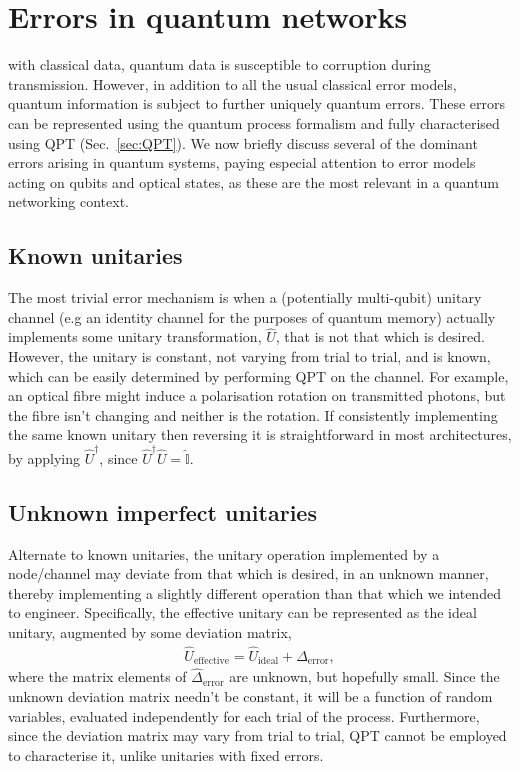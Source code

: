 %
%

\section{Errors in quantum networks} \label{sec:errors_in_nets} 

 with classical data, quantum data is susceptible to corruption during transmission. However, in addition to all the usual classical error models, quantum information is subject to further uniquely quantum errors. These errors can be represented using the quantum process formalism and fully characterised using QPT (Sec.~\ref{sec:QPT}). We now briefly discuss several of the dominant errors arising in quantum systems, paying especial attention to error models acting on qubits and optical states, as these are the most relevant in a quantum networking context.

%
%

\subsection{Known unitaries} 

The most trivial error mechanism is when a (potentially multi-qubit) unitary channel (e.g an identity channel for the purposes of quantum memory) actually implements some unitary transformation, $\hat{U}$, that is not that which is desired. However, the unitary is constant, not varying from trial to trial, and is known, which can be easily determined by performing QPT on the channel. For example, an optical fibre might induce a polarisation rotation on transmitted photons, but the fibre isn't changing and neither is the rotation. If consistently implementing the same known unitary then reversing it is straightforward in most architectures, by applying $\hat{U}^\dag$, since $\hat{U}^\dag\hat{U}=\hat{\mathbb{I}}$.

%
%

\subsection{Unknown imperfect unitaries} 

Alternate to known unitaries, the unitary operation implemented by a node/channel may deviate from that which is desired, in an unknown manner, thereby implementing a slightly different operation than that which we intended to engineer. Specifically, the effective unitary can be represented as the ideal unitary, augmented by some deviation matrix,
\begin{align}
	\hat{U}_\mathrm{effective} = \hat{U}_\mathrm{ideal} + \hat{\Delta}_\mathrm{error},
\end{align}
where the matrix elements of $\hat{\Delta}_\mathrm{error}$ are unknown, but hopefully small. Since the unknown deviation matrix needn't be constant, it will be a function of random variables, evaluated independently for each trial of the process. Furthermore, since the deviation matrix may vary from trial to trial, QPT cannot be employed to characterise it, unlike unitaries with fixed errors.

